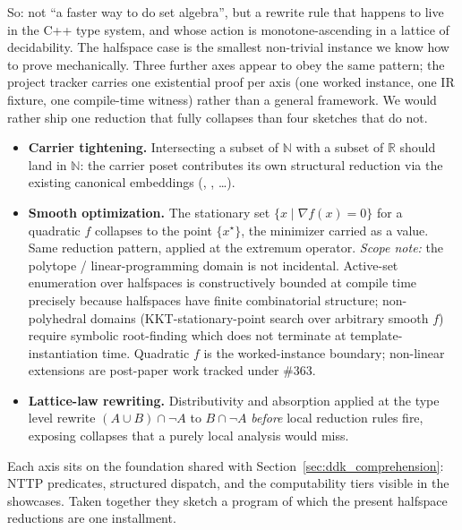 \documentclass[11pt, a4paper]{article}
\begin{document}
So: not ``a faster way to do set algebra'', but a rewrite rule that
happens to live in the C++ type system, and whose action is
monotone-ascending in a lattice of decidability. The halfspace case is
the smallest non-trivial instance we know how to prove mechanically.
Three further axes appear to obey the same pattern; the project tracker
carries one existential proof per axis (one worked instance, one IR
fixture, one compile-time witness) rather than a general framework.
We would rather ship one reduction that fully collapses than four
sketches that do not.

\begin{itemize}
  \item \textbf{Carrier tightening.} Intersecting a subset of
    $\mathbb{N}$ with a subset of $\mathbb{R}$ should land in $\mathbb{N}$:
    the carrier poset contributes its own structural reduction via the
    existing canonical embeddings (,
    , \ldots).
  \item \textbf{Smooth optimization.} The stationary set
    $\{x \mid \nabla f(x) = 0\}$ for a quadratic $f$ collapses to
    the point $\{x^\star\}$, the minimizer carried as a value.
    Same reduction pattern, applied at the extremum operator.
    \emph{Scope note:} the polytope / linear-programming domain is not
    incidental.  Active-set enumeration over halfspaces is
    constructively bounded at compile time precisely because halfspaces
    have finite combinatorial structure; non-polyhedral domains
    (KKT-stationary-point search over arbitrary smooth $f$) require
    symbolic root-finding which does not terminate at template-
    instantiation time.  Quadratic $f$ is the worked-instance
    boundary; non-linear extensions are post-paper work tracked
    under \#363.
  \item \textbf{Lattice-law rewriting.} Distributivity and
    absorption applied at the type level rewrite
    $(A \cup B) \cap \lnot A$ to $B \cap \lnot A$ \emph{before} local
    reduction rules fire, exposing collapses that a purely local analysis
    would miss.
\end{itemize}

Each axis sits on the foundation shared with Section~\ref{sec:ddk_comprehension}: NTTP
predicates, structured  dispatch, and the computability
tiers visible in the showcases. Taken together they sketch a program of
which the present halfspace reductions are one installment.
\end{document}
